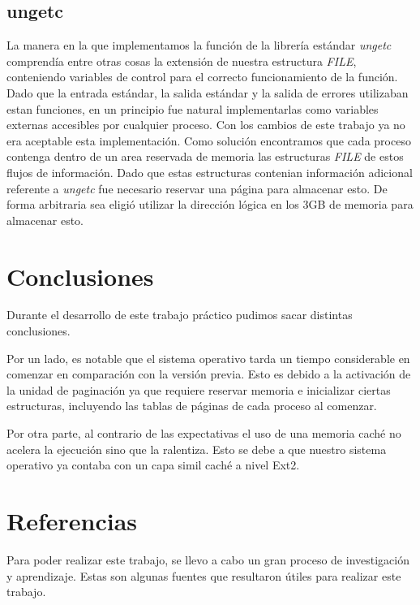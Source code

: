 \documentclass[a4paper,10pt]{article}
\begin{document}
	\subsection{ungetc}

	La manera en la que implementamos la función de la librería estándar \textit{ungetc} comprendía entre otras cosas la
	extensión de nuestra estructura \textit{FILE}, conteniendo variables de control para el correcto funcionamiento de la función.
	Dado que la entrada estándar, la salida estándar y la salida de errores utilizaban estan funciones, en un principio fue		
	natural implementarlas como variables externas accesibles por cualquier proceso. Con los cambios de este trabajo ya no era
	aceptable esta implementación.
	Como solución encontramos que cada proceso contenga dentro de un area reservada de memoria las estructuras \textit{FILE} de 
	estos flujos de información. Dado que estas estructuras contenian información adicional referente a \textit{ungetc} fue 
	necesario reservar una página para almacenar esto. De forma arbitraria sea eligió utilizar la dirección lógica en los 3GB 
	de memoria para almacenar esto.

\newpage

\section{Conclusiones}

Durante el desarrollo de este trabajo práctico pudimos sacar distintas conclusiones.

Por un lado, es notable que el sistema operativo tarda un tiempo considerable en comenzar en comparación con la versión previa.
Esto es debido a la activación de la unidad de paginación ya que requiere reservar memoria e inicializar ciertas estructuras, 
incluyendo las tablas de páginas de cada proceso al comenzar. 

Por otra parte, al contrario de las expectativas el uso de una memoria caché no acelera la ejecución sino que la ralentiza. Esto se
debe a que nuestro sistema operativo ya contaba con un capa simil caché a nivel Ext2. 

\newpage     
\section{Referencias}

Para poder realizar este trabajo, se llevo a cabo un gran proceso de investigación y aprendizaje. Estas son algunas fuentes que resultaron útiles para realizar 
este trabajo.\\
\end{document}
